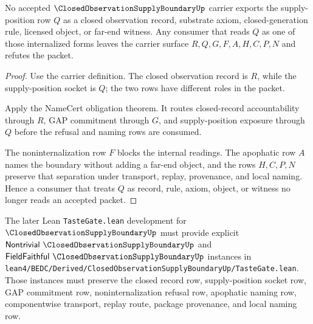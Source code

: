 \begin{theorem}
\label{thm:closed-observation-supply-boundary-noninternalization}
No accepted $\ClosedObservationSupplyBoundaryUp$ carrier exports the supply-position row $Q$ as a closed observation record, substrate axiom, closed-generation rule, licensed object, or far-end witness. Any consumer that reads $Q$ as one of those internalized forms leaves the carrier surface $R,Q,G,F,A,H,C,P,N$ and refutes the packet.
\end{theorem}
\begin{proof}
Use the carrier definition. The closed observation record is $R$, while the supply-position socket is $Q$; the two rows have different roles in the packet.

Apply the NameCert obligation theorem. It routes closed-record accountability through $R$, GAP commitment through $G$, and supply-position exposure through $Q$ before the refusal and naming rows are consumed.

The noninternalization row $F$ blocks the internal readings. The apophatic row $A$ names the boundary without adding a far-end object, and the rows $H,C,P,N$ preserve that separation under transport, replay, provenance, and local naming. Hence a consumer that treats $Q$ as record, rule, axiom, object, or witness no longer reads an accepted packet.
\end{proof}



The later Lean \texttt{TasteGate.lean} development for $\ClosedObservationSupplyBoundaryUp$ must provide explicit $\mathsf{Nontrivial}\ \ClosedObservationSupplyBoundaryUp$ and $\mathsf{FieldFaithful}\ \ClosedObservationSupplyBoundaryUp$ instances in \texttt{lean4/BEDC/Derived/ClosedObservationSupplyBoundaryUp/TasteGate.lean}. Those instances must preserve the closed record row, supply-position socket row, GAP commitment row, noninternalization refusal row, apophatic naming row, componentwise transport, replay route, package provenance, and local naming row.

